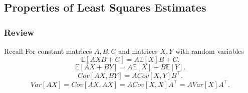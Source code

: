 \documentclass[serif,mathserif,professionalfont]{beamer}
\begin{document}
	


\subsection{Properties of Least Squares Estimates}




%	
%	
%	


%	
%	
%	





\begin{frame}
	
	\frametitle{Review}
	
	\begin{block}{Recall}
		For constant matrices $ A, B, C $ and matrices $ X, Y $ with random variables
		$$ \mathbb{E} \left[A X B + C \right] = A \mathbb{E}\left[X \right] B + C. $$
		$$ \mathbb{E} \left[A X + B Y \right] = A \mathbb{E}\left[X \right] + B \mathbb{E}\left[Y \right]. $$
		$$ Cov\left[AX, BY \right] = A Cov \left[X, Y \right] B^\top. $$
		$$ Var\left[AX \right] = Cov \left[AX, AX \right] = A Cov \left[X, X \right] A^\top = A Var\left[X \right] A^\top. $$
	\end{block}
	
	
	
\end{frame}
\end{document}
